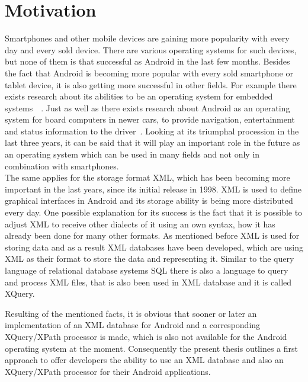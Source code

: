\section{Motivation}
\label{sec:introduction:motivation}
Smartphones and other mobile devices are gaining more popularity with every day and every sold device.
There are various operating systems for such devices, but none of them is that successful as Android in the last few months.
Besides the fact that Android is becoming more popular with every sold smartphone or tablet device, it is also getting more successful in other fields.
For example there exists research about its abilities to be an operating system for embedded systems~\cite{lee2010evaluating}~\cite{maia2010evaluating}.
Just as well as there exists research about Android as an operating system for board computers in newer cars, to provide navigation, entertainment and status information to the driver~\cite{macario2009vehicle}.
Looking at its triumphal procession in the last three years, it can be said that it will play an important role in the future as an operating system which can be used in many fields and not only in combination with smartphones.\\
The same applies for the storage format XML, which has been becoming more important in the last years, since its initial release in 1998.
XML is used to define graphical interfaces in Android and its storage ability is being more distributed every day.
One possible explanation for its success is the fact that it is possible to adjust XML to receive other dialects of it using an own syntax, how it has already been done for many other formats.
As mentioned before XML is used for storing data and as a result XML databases have been developed, which are using XML as their format to store the data and representing it.
Similar to the query language of relational database systems SQL there is also a language to query and process XML files, that is also been used in XML database and it is called XQuery.




Resulting of the mentioned facts, it is obvious that sooner or later an implementation of an XML database for Android and a corresponding XQuery/XPath processor is made, which is also not available for the Android operating system at the moment.
Consequently the present thesis outlines a first approach to offer developers the ability to use an XML database and also an XQuery/XPath processor for their Android applications.



